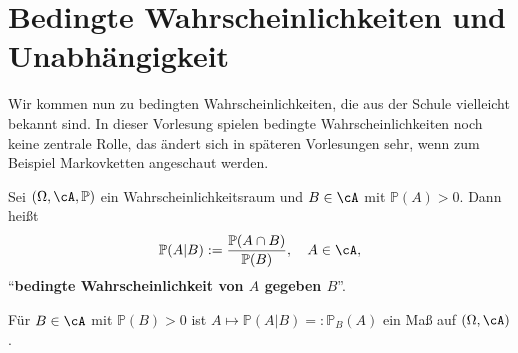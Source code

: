 \marginpar{\textcolor{red}{Vorlesung 23}}

\section{Bedingte Wahrscheinlichkeiten und Unabhängigkeit}\label{Sunab}
Wir kommen nun zu bedingten Wahrscheinlichkeiten, die aus der Schule vielleicht bekannt sind. In dieser Vorlesung spielen bedingte Wahrscheinlichkeiten noch keine zentrale Rolle, das \"andert sich in sp\"ateren Vorlesungen sehr, wenn zum Beispiel Markovketten angeschaut werden.
\begin{deff}
	Sei $(\Omega, \cA, \mathbb P)$ ein Wahrscheinlichkeitsraum und $B \in \cA$ mit $ \mathbb P(A)> 0$. Dann heißt \[ \mathbb{P}(A|B) := \frac{\mathbb{P}(A \cap B)}{\mathbb{P}(B)}, \quad A \in \cA, \]
	\enquote{\textbf{bedingte Wahrscheinlichkeit von $A$ gegeben $B$}}.	
\end{deff}

\begin{lemma}
	Für $ B \in \cA$ mit $ \mathbb{P}(B)> 0$ ist $ A \mapsto \mathbb{P}(A|B) =: \mathbb{P}_B(A)$ ein Maß auf $(\Omega, \cA)$.
\end{lemma}

